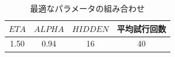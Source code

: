 \begin{table}[htb]
 \begin{center}
  \begin{tabular}[htb]{|c|c|c|c|} \hline
   $ETA$ & $ALPHA$ & $HIDDEN$ & 平均試行回数\\ \hline \hline
   1.50 & 0.94 & 16 & 40\\ \hline
  \end{tabular}
  \caption{最適なパラメータの組み合わせ}
  \label{table:parameters}
 \end{center}
\end{table}
